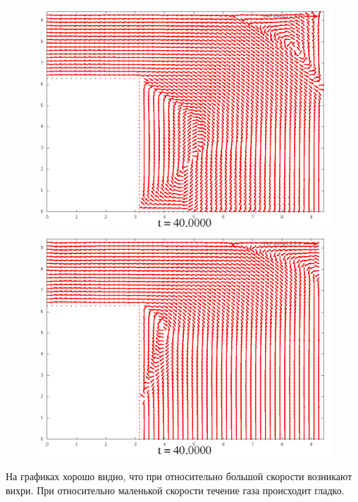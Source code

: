 \documentclass[a4paper, 12pt]{article}
\begin{document}
\begin{figure}[h]
	\begin{minipage}[h]{0.4\linewidth}
		\includegraphics[width=1\linewidth]{./img/01_1_1/V/200}
	\end{minipage}
	\hfill
	\begin{minipage}[h]{0.4\linewidth}
		\includegraphics[width=1\linewidth]{./img/01_1_01/V/200}
	\end{minipage}
\end{figure}

На графиках хорошо видно, что при относительно большой скорости возникают вихри.
При относительно маленькой скорости течение газа происходит гладко.
\end{document}
